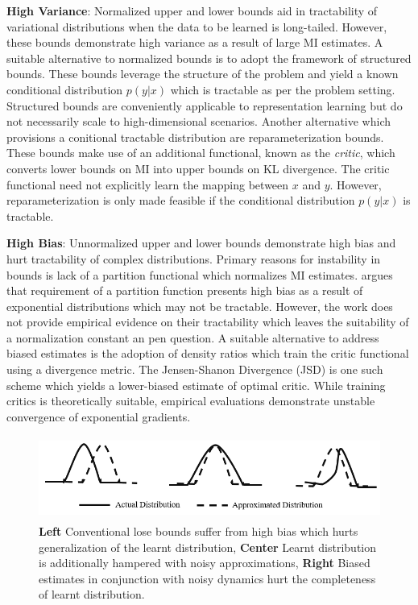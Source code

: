 \documentclass{article}
\begin{document}
\textbf{High Variance}: Normalized upper and lower bounds aid in tractability of variational distributions when the data to be learned is long-tailed. However, these bounds demonstrate high variance as a result of large MI estimates. A suitable alternative to normalized bounds is to adopt the framework of structured bounds. These bounds leverage the structure of the problem and yield a known conditional distribution $p(y|x)$ which is tractable as per the problem setting. Structured bounds are conveniently applicable to representation learning \cite{cpc,variational} but do not necessarily scale to high-dimensional scenarios. Another alternative which provisions a conitional tractable distribution are reparameterization bounds. These bounds make use of an additional functional, known as the \textit{critic}, which converts lower bounds on MI into upper bounds on KL divergence. The critic functional need not explicitly learn the mapping between $x$ and $y$. However, reparameterization is only made feasible if the conditional distribution $p(y|x)$ is tractable. 

\textbf{High Bias}: Unnormalized upper and lower bounds demonstrate high bias and hurt tractability of complex distributions. Primary reasons for instability in bounds is lack of a partition functional which normalizes MI estimates. \cite{variational} argues that requirement of a partition function presents high bias as a result of exponential distributions which may not be tractable. However, the work does not provide empirical evidence on their tractability which leaves the suitability of a normalization constant an pen question. A suitable alternative to address biased estimates is the adoption of density ratios which train the critic functional using a divergence metric. The Jensen-Shanon Divergence (JSD) is one such scheme which yields a lower-biased estimate of optimal critic. While training critics is theoretically suitable, empirical evaluations \cite{variational} demonstrate unstable convergence of exponential gradients. 

\begin{figure}[ht]
  \centering
  \includegraphics[height=2.75cm,width=13cm]{dist.PNG}
  \caption{\textbf{Left} Conventional lose bounds suffer from high bias which hurts generalization of the learnt distribution, \textbf{Center} Learnt distribution is additionally hampered with noisy approximations, \textbf{Right} Biased estimates in conjunction with noisy dynamics hurt the completeness of learnt distribution.}
  \label{fig:dist}
\end{figure}
\end{document}
